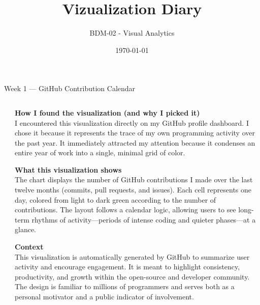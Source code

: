 \documentclass[aspectratio=169]{beamer}
\title{Vizualization Diary}
\subtitle{BDM-02 - Visual Analytics}
\author[Samuel Chapuis]{\and S.~Chapuis}
\date{\today}
\begin{document}
\frame{\titlepage}

\begin{frame}{Week 1 — GitHub Contribution Calendar}
\small
\begin{columns}[T,onlytextwidth]
  \begin{column}{0.48\textwidth}
    \centering
  \end{column}

  \begin{column}{0.52\textwidth}
    \justifying %
    \textbf{How I found the visualization (and why I picked it)}\\
    I encountered this visualization directly on my GitHub profile dashboard. I chose it because it represents the trace of my own programming activity over the past year. It immediately attracted my attention because it condenses an entire year of work into a single, minimal grid of color.

    \vspace{2mm}
    \textbf{What this visualization shows}\\
    The chart displays the number of GitHub contributions I made over the last twelve months (commits, pull requests, and issues). Each cell represents one day, colored from light to dark green according to the number of contributions. The layout follows a calendar logic, allowing users to see long-term rhythms of activity—periods of intense coding and quieter phases—at a glance.

    \vspace{2mm}
    \textbf{Context}\\
    This visualization is automatically generated by GitHub to summarize user activity and encourage engagement. It is meant to highlight consistency, productivity, and growth within the open-source and developer community. The design is familiar to millions of programmers and serves both as a personal motivator and a public indicator of involvement.


\end{column}
\end{columns}
\end{frame}
\end{document}
